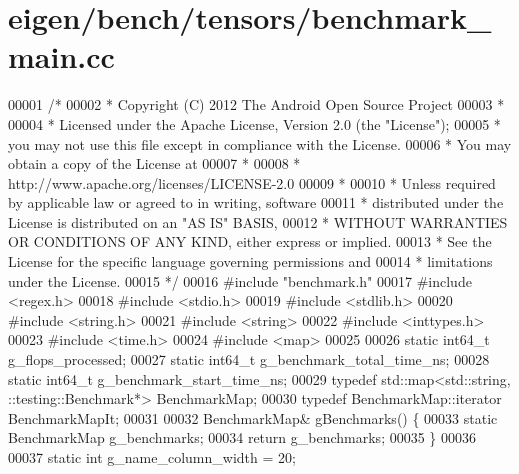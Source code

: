\hypertarget{eigen_2bench_2tensors_2benchmark__main_8cc_source}{}\section{eigen/bench/tensors/benchmark\+\_\+main.cc}
\label{eigen_2bench_2tensors_2benchmark__main_8cc_source}

\begin{DoxyCode}
00001 \textcolor{comment}{/*}
00002 \textcolor{comment}{ * Copyright (C) 2012 The Android Open Source Project}
00003 \textcolor{comment}{ *}
00004 \textcolor{comment}{ * Licensed under the Apache License, Version 2.0 (the "License");}
00005 \textcolor{comment}{ * you may not use this file except in compliance with the License.}
00006 \textcolor{comment}{ * You may obtain a copy of the License at}
00007 \textcolor{comment}{ *}
00008 \textcolor{comment}{ *      http://www.apache.org/licenses/LICENSE-2.0}
00009 \textcolor{comment}{ *}
00010 \textcolor{comment}{ * Unless required by applicable law or agreed to in writing, software}
00011 \textcolor{comment}{ * distributed under the License is distributed on an "AS IS" BASIS,}
00012 \textcolor{comment}{ * WITHOUT WARRANTIES OR CONDITIONS OF ANY KIND, either express or implied.}
00013 \textcolor{comment}{ * See the License for the specific language governing permissions and}
00014 \textcolor{comment}{ * limitations under the License.}
00015 \textcolor{comment}{ */}
00016 \textcolor{preprocessor}{#include "benchmark.h"}
00017 \textcolor{preprocessor}{#include <regex.h>}
00018 \textcolor{preprocessor}{#include <stdio.h>}
00019 \textcolor{preprocessor}{#include <stdlib.h>}
00020 \textcolor{preprocessor}{#include <string.h>}
00021 \textcolor{preprocessor}{#include <string>}
00022 \textcolor{preprocessor}{#include <inttypes.h>}
00023 \textcolor{preprocessor}{#include <time.h>}
00024 \textcolor{preprocessor}{#include <map>}
00025 
00026 \textcolor{keyword}{static} int64\_t g\_flops\_processed;
00027 \textcolor{keyword}{static} int64\_t g\_benchmark\_total\_time\_ns;
00028 \textcolor{keyword}{static} int64\_t g\_benchmark\_start\_time\_ns;
00029 \textcolor{keyword}{typedef} std::map<std::string, ::testing::Benchmark*> BenchmarkMap;
00030 \textcolor{keyword}{typedef} BenchmarkMap::iterator BenchmarkMapIt;
00031 
00032 BenchmarkMap& gBenchmarks() \{
00033   \textcolor{keyword}{static} BenchmarkMap g\_benchmarks;
00034   \textcolor{keywordflow}{return} g\_benchmarks;
00035 \}
00036 
00037 \textcolor{keyword}{static} \textcolor{keywordtype}{int} g\_name\_column\_width = 20;

\end{DoxyCode}
